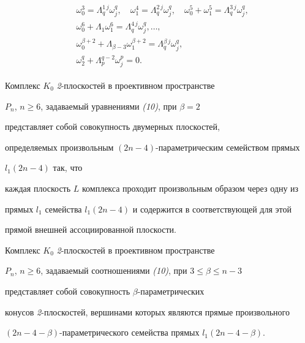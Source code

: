 \begin{align} 


\begin{split} 


& \omega_0^3=\Lambda{}_q^{1\,j}\omega_j^q, \quad 


\omega_1^4=\Lambda{}_q^{2\,j}\omega_j^q, \quad 


\omega_0^5+\omega_1^5=\Lambda{}_q^{3\,j}\omega_j^q, \\ 


& \omega_0^6+\Lambda{}_1\omega_1^6=\Lambda{}_q^{4\,j}\omega_j^q,\dotsc, \\ 


& \omega_0^{\beta+2}+\Lambda_{\beta-3}\omega_1^{\beta+2}= 


\Lambda{}_q^{\beta\,j}\omega_j^q, \\ 


& \omega_2^q+\Lambda{}_p^{q-2}\omega_j^p=0. 


\end{split} 


\end{align} 


 


\begin{thm} Комплекс $K_0$ {\em 2}-плоскостей в проективном пространстве 


$P_n$, $n\ge 6$, задаваемый уравнениями {\em (10)}, при $\beta=2$ 


представляет собой совокупность двумерных плоскостей, 


определяемых произвольным $(2n-4)$-параметрическим семейством прямых 


$l_1(2n-4)$ так, что 


каждая плоскость $L$ комплекса проходит произвольным образом через одну из 


прямых $l_1$ семейства $l_1(2n-4)$ и содержится в соответствующей для этой 


прямой внешней ассоциированной плоскости. 


\end{thm} 


 


\begin{thm} Комплекс $K_0$ {\em 2}-плоскостей в проективном пространстве 


$P_n$, $n\ge 6$, задаваемый соотношениями {\em (10)}, при $3\le\beta\le n-3$ 


представляет собой совокупность $\beta$-па\-ра\-мет\-ри\-чес\-ких 


конусов {\em 2}-плоскостей, вершинами которых являются прямые произвольного 


$(2n-4-\beta)$-параметрического семейства прямых $l_1(2n-4-\beta)$. 


\end{thm} 



